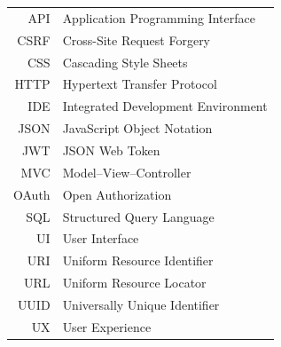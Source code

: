 \documentclass[czech,master,oneside]{ctufit-thesis}
\begin{document}
\chapter{\thectufitabbreviationlabel}

\begin{tabular}{rl}
  API   & Application Programming Interface                 \\
  CSRF  & Cross-Site Request Forgery                        \\
  CSS   & Cascading Style Sheets                            \\
  HTTP  & Hypertext Transfer Protocol                       \\
  IDE   & Integrated Development Environment                \\
  JSON  & JavaScript Object Notation                        \\
  JWT   & JSON Web Token                                    \\
  MVC   & Model--View--Controller                           \\
  OAuth & Open Authorization                                \\
  SQL   & Structured Query Language                         \\
  UI    & User Interface                                    \\
  URI   & Uniform Resource Identifier                       \\
  URL   & Uniform Resource Locator                          \\
  UUID  & Universally Unique Identifier                     \\
  UX    & User Experience
\end{tabular}
\resumeTOCentries
\mainmatter\mainmatterinit %


\appendix\appendixinit %


\backmatter %

\printbibliography %

\end{document}
